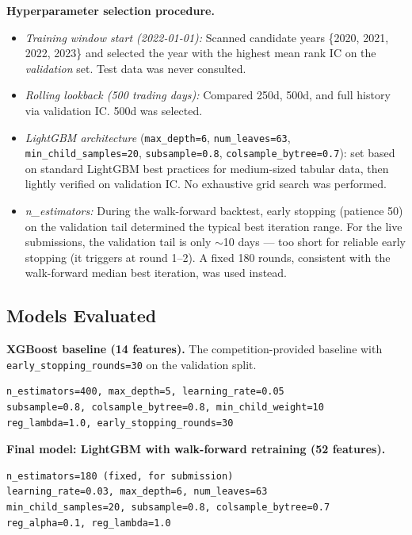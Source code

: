 \documentclass[11pt,a4paper]{article}
\begin{document}
\textbf{Hyperparameter selection procedure.}
\begin{itemize}
  \item \emph{Training window start (2022-01-01):} Scanned candidate years
        \{2020, 2021, 2022, 2023\} and selected the year with the highest
        mean rank IC on the \emph{validation} set. Test data was never
        consulted.
  \item \emph{Rolling lookback (500 trading days):} Compared 250d, 500d, and
        full history via validation IC. 500d was selected.
  \item \emph{LightGBM architecture} (\texttt{max\_depth=6},
        \texttt{num\_leaves=63}, \texttt{min\_child\_samples=20},
        \texttt{subsample=0.8}, \texttt{colsample\_bytree=0.7}): set based
        on standard LightGBM best practices for medium-sized tabular data,
        then lightly verified on validation IC. No exhaustive grid search
        was performed.
  \item \emph{n\_estimators:} During the walk-forward backtest, early
        stopping (patience 50) on the validation tail determined the
        typical best iteration range. For the live submissions, the
        validation tail is only $\sim$10 days --- too short for reliable
        early stopping (it triggers at round 1--2). A fixed 180 rounds,
        consistent with the walk-forward median best iteration, was used
        instead.
\end{itemize}

\subsection{Models Evaluated}

\textbf{XGBoost baseline (14 features).}
The competition-provided baseline with \texttt{early\_stopping\_rounds=30}
on the validation split.
\begin{verbatim}
n_estimators=400, max_depth=5, learning_rate=0.05
subsample=0.8, colsample_bytree=0.8, min_child_weight=10
reg_lambda=1.0, early_stopping_rounds=30
\end{verbatim}

\textbf{Final model: LightGBM with walk-forward retraining (52 features).}
\begin{verbatim}
n_estimators=180 (fixed, for submission)
learning_rate=0.03, max_depth=6, num_leaves=63
min_child_samples=20, subsample=0.8, colsample_bytree=0.7
reg_alpha=0.1, reg_lambda=1.0
\end{verbatim}
\end{document}
